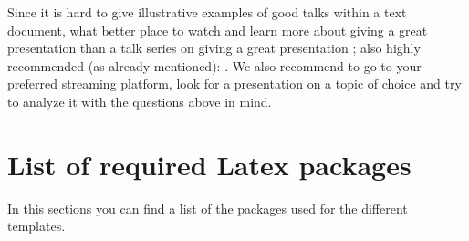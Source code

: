 \documentclass[twocolumn]{mlai-guide}
\newif\ifchecklist
\begin{document}
Since it is hard to give illustrative examples of good talks within a text document, what better place to watch and learn more about giving a great presentation than a talk series on giving a great presentation \autocite{tedTEDTalksFull}; also highly recommended (as already mentioned): \cite{winston_how_to_speak}. We also recommend to go to your preferred streaming platform, look for a presentation on a topic of choice and try to analyze it with the questions above in mind. 

 


\printbibliography

\appendix

\checklisttrue
\ifchecklist 
\newpage
\onecolumn

\twocolumn
\else
\fi 
\newpage
\section{List of required Latex packages}
In this sections you can find a list of the packages used for the different templates.
\end{document}
